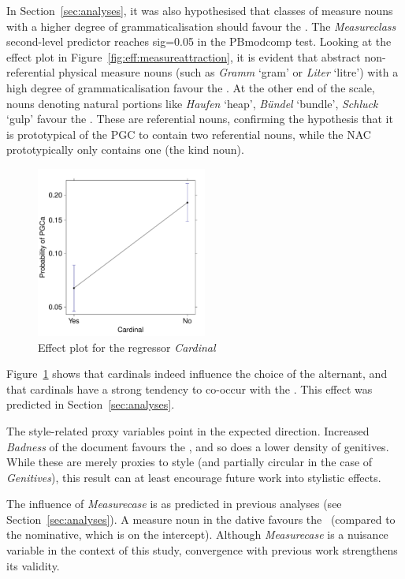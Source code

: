 In Section~\ref{sec:analyses}, it was also hypothesised that classes of measure nouns with a higher degree of grammaticalisation should favour the \NACa.
The \textit{Measureclass} second-level predictor reaches sig=0.05 in the PBmodcomp test.
Looking at the effect plot in Figure~\ref{fig:eff:measureattraction}, it is evident that abstract non-referential physical measure nouns (such as \textit{Gramm} `gram' or \textit{Liter} `litre') with a high degree of grammaticalisation favour the \NACa.
At the other end of the scale, nouns denoting natural portions like \textit{Haufen} `heap', \textit{Bündel} `bundle', \textit{Schluck} `gulp' favour the \PGCa.
These are referential nouns, confirming the hypothesis that it is prototypical of the PGC to contain two referential nouns, while the NAC prototypically only contains one (the kind noun).

\begin{figure}[h!]
  \centering
  \includegraphics[width=0.5\textwidth]{../R/output/corpus_Cardinal}
  \caption{Effect plot for the regressor \textit{Cardinal}}
  \label{fig:eff:leftcontext}
\end{figure}

Figure~\ref{fig:eff:leftcontext} shows that cardinals indeed influence the choice of the alternant, and that cardinals have a strong tendency to co-occur with the \NACa.
This effect was predicted in Section~\ref{sec:analyses}.

The style-related proxy variables point in the expected direction.
Increased \textit{Badness} of the document favours the \NACa, and so does a lower density of genitives.
While these are merely proxies to style (and partially circular in the case of \textit{Genitives}), this result can at least encourage future work into stylistic effects. 

The influence of \textit{Measurecase} is as predicted in previous analyses (see Section~\ref{sec:analyses}).
A measure noun in the dative favours the \PGCa\ (compared to the nominative, which is on the intercept).
Although \textit{Measurecase} is a nuisance variable in the context of this study, convergence with previous work strengthens its validity.


